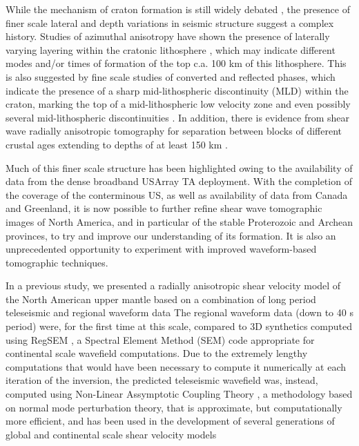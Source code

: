 \documentclass[12pt]{article}
\begin{document}
While the mechanism of craton formation is still widely debated \citep[e.g.][]{s2005archean,lee2011building}, the presence of finer scale lateral and depth variations in seismic structure suggest a complex history. Studies of azimuthal anisotropy have shown the presence of laterally varying layering within the cratonic lithosphere \citep[e.g.][]{levin1999shear,deschamps2008stratified,yuan2010lithospheric}, which may indicate different modes and/or times of formation of the top c.a. 100 km of this lithosphere. This is also suggested by fine scale studies of converted and reflected phases, which indicate the presence of a sharp mid-lithospheric discontinuity (MLD) within the craton, marking the top of a mid-lithospheric low velocity zone \citep{thybo1997seismic,bostock1998mantle,abt2010north,fischer2010lithosphere,rader2015characterization,ford2016midlithospheric} and even possibly several mid-lithospheric discontinuities \citep{calo2016layered}. In addition, there is evidence from shear wave radially anisotropic tomography for separation between blocks of different crustal ages extending to depths of at least 150 km \citep[e.g.][]{yuan2014lithospheric}.


Much of this finer scale structure has been highlighted owing to the availability of data from the dense broadband USArray TA deployment. With the completion of the coverage of the conterminous US, as well as availability of data from Canada and Greenland, it is now possible to further refine shear wave tomographic images of North America, and in particular of the stable Proterozoic and Archean provinces, to try and improve our understanding of its formation. It is also an unprecedented opportunity to experiment with improved waveform-based tomographic techniques.

In a previous study, we presented a radially anisotropic shear velocity model of the North American upper mantle based on a combination of long period teleseismic and regional waveform data \citep{yuan2014lithospheric} The regional waveform data (down to 40 s period) were, for the first time at this scale, compared to 3D synthetics computed using RegSEM \citep{cupillard2012regsem}, a Spectral Element Method (SEM) code appropriate for continental scale wavefield computations. Due to the extremely lengthy computations that would have been necessary to compute it numerically at each iteration of the inversion, the predicted teleseismic wavefield was, instead, computed using Non-Linear Assymptotic Coupling Theory \citep[NACT,][]{li1995comparison}, a methodology based on normal mode perturbation theory, that is approximate, but computationally more efficient, and has been used in the development of several generations of global and continental scale shear velocity models \citep{li1996global,megnin2000three,gung2003global,panning2006three,yuan20113}
 
\end{document}
